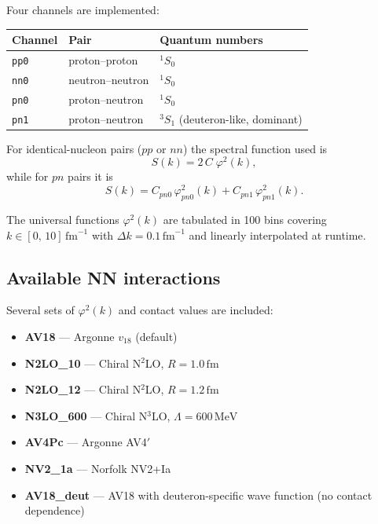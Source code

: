 \documentclass[11pt,a4paper]{article}
\newcommand{\unit}[1]{\,\mathrm{#1}}
\newcommand{\fm}{\unit{fm}}
\newcommand{\MeV}{\unit{MeV}}
\begin{document}
Four channels are implemented:
\begin{center}
\begin{tabular}{lll}
\toprule
Channel & Pair & Quantum numbers \\
\midrule
\texttt{pp0}  & proton--proton   & ${}^{1}S_{0}$ \\
\texttt{nn0}  & neutron--neutron & ${}^{1}S_{0}$ \\
\texttt{pn0}  & proton--neutron  & ${}^{1}S_{0}$ \\
\texttt{pn1}  & proton--neutron  & ${}^{3}S_{1}$ (deuteron-like, dominant) \\
\bottomrule
\end{tabular}
\end{center}

For identical-nucleon pairs ($pp$ or $nn$) the spectral function used is
\begin{equation}
  S(k) = 2\,C\;\varphi^{2}(k),
\end{equation}
while for $pn$ pairs it is
\begin{equation}
  S(k) = C_{pn0}\,\varphi_{pn0}^{2}(k) + C_{pn1}\,\varphi_{pn1}^{2}(k).
\end{equation}

The universal functions $\varphi^{2}(k)$ are tabulated in 100 bins
covering $k \in [0,\,10]\fm^{-1}$ with $\Delta k = 0.1\fm^{-1}$ and
linearly interpolated at runtime.

\subsection{Available NN interactions}

Several sets of $\varphi^{2}(k)$ and contact values are included:
\begin{itemize}[nosep]
  \item \textbf{AV18} --- Argonne $v_{18}$ (default)
  \item \textbf{N2LO\_10} --- Chiral N$^{2}$LO, $R = 1.0\fm$
  \item \textbf{N2LO\_12} --- Chiral N$^{2}$LO, $R = 1.2\fm$
  \item \textbf{N3LO\_600} --- Chiral N$^{3}$LO, $\Lambda = 600\MeV$
  \item \textbf{AV4Pc} --- Argonne AV4$'$
  \item \textbf{NV2\_1a} --- Norfolk NV2+Ia
  \item \textbf{AV18\_deut} --- AV18 with deuteron-specific wave function
        (no contact dependence)
\end{itemize}
\end{document}
